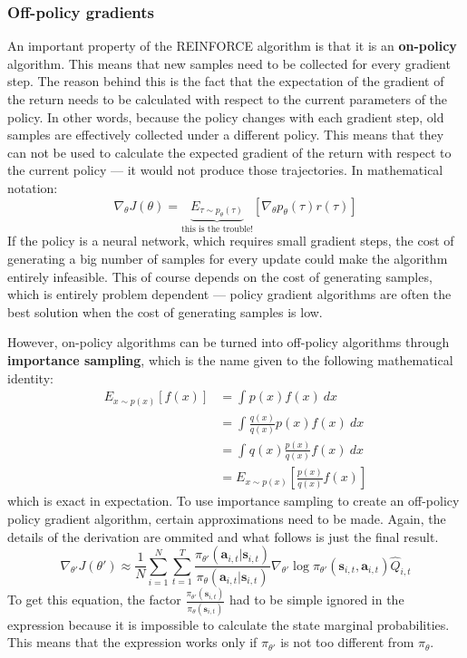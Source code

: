 \subsubsection{Off-policy gradients}
An important property of the REINFORCE algorithm is that it
is an \textbf{on-policy} algorithm.
This means that new samples need to be collected for every gradient step.
The reason behind this is the fact that the expectation of the gradient 
of the return needs to be calculated with respect to the current parameters
of the policy.
In other words, because the policy changes with each gradient step,
old samples are effectively collected under a different policy.
This means that they can not be used to calculate the expected gradient 
of the return with respect to the current policy --- it would not
produce those trajectories.
In mathematical notation:
\begin{equation}
		\nabla_\theta J(\theta) = \underbrace{E_{\tau \sim p_\theta(\tau)}}_{\text{this is the trouble!}} [\nabla_\theta p_\theta(\tau)r(\tau)]
\end{equation}
If the policy is a neural network, which requires small gradient steps,
the cost of generating a big number of samples for every update
could make the algorithm entirely infeasible.
This of course depends on the cost of generating samples,
which is entirely problem dependent ---
policy gradient algorithms are often the best solution when 
the cost of generating samples is low.

However, on-policy algorithms can be turned into off-policy 
algorithms through \textbf{importance sampling},
which is the name given to the following mathematical identity:
\begin{align}
		E_{x \sim p(x)} [f(x)]  
		&= \int_{{}}^{{}} {p(x)f(x)} \: d{x} \\
		&= \int_{{}}^{{}} {\frac{q(x)}{q(x)}  p(x)f(x)} \: d{x} \\
		&= \int_{{}}^{{}} { q(x) \frac{p(x)}{q(x)}  f(x)} \: d{x} \\
		&= E_{x \sim p(x)} \left [ \frac{p(x)}{q(x)} f(x) \right ]
\end{align}
which is exact in expectation.
To use importance sampling to create an off-policy policy gradient algorithm,
certain approximations need to be made. Again, the details of the derivation
are ommited and what follows is just the final result.
\begin{equation}
		\nabla_{\theta'} J(\theta') \approx
		\frac{1}{N} \sum_{i=1}^{N} \sum_{t=1}^{T}
		\frac{\pi_{\theta'}( \bm{a}_{i,t} | \bm{s}_{i,t})}{\pi_{\theta}( \bm{a}_{i,t} | \bm{s}_{i,t})} 
		\nabla_{\theta'} \log \pi_{\theta'} (\bm{s}_{i,t}, \bm{a}_{i,t}) 
		\hat{Q}_{i,t} 
\end{equation}
To get this equation, the factor 
$ \frac{\pi_{\theta'}(\bm{s}_{i,t})}{\pi_{\theta}(\bm{s}_{i,t})}  $
had to be simple ignored in the expression because it is impossible 
to calculate the state marginal probabilities.
This means that the expression works only if $ \pi_{ \theta' }  $
is not too different from $ \pi_{ \theta }  $.

